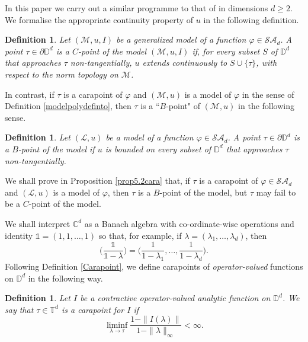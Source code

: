 \documentclass[11pt, reqno]{amsart}
\newtheorem{definition}[theorem]{Definition}
\newcommand\1{\boldsymbol {1}}
\renewcommand{\L}{\mathcal{L}}
\newcommand{\M}{\mathcal{M}}
\newcommand{\T}{\mathbb{T}}
\newcommand{\D}{\mathbb{D}}
\newcommand{\ph}{\varphi}
\newcommand\la{\lambda}
\numberwithin{equation}{section}
\begin{document}
 In this paper we carry out a similar programme to that of \cite{ATY2} in dimensions $d \geq 2$.
 We formalise the appropriate continuity property of $u$ in the following definition.
\begin{definition}{}
Let $(\mathcal{M},u,I)$ be a generalized model of a function $\varphi\in\mathcal{SA}_{d}$. A point $\tau\in \partial\mathbb{D}^{d}$ is a {\em{$C$-point of the model}} $(\mathcal{M},u,I)$ if, for every subset $S$ of $\mathbb{D}^{d}$ that approaches $\tau$ non-tangentially, $u$ extends continuously to $S\cup\{\tau\}$, with respect to the norm topology on $\mathcal{M}$. 
\end{definition}
In contrast, if $\tau$ is a carapoint of $\ph$ and $(\M,u)$ is a model of $\ph$ in the sense of Definition \ref{modelpolydefinto}, then $\tau$ is a ``$B$-point" of $(\M,u)$ in the following sense.
\begin{definition}{} Let $(\mathcal{L},u)$ be a  model of a function $\varphi\in\mathcal{SA}_{d}$. A point $\tau\in \partial\mathbb{D}^{d}$ is a {\em{$B$-point of the model}} if $u$ is bounded on every subset of $\mathbb{D}^{d}$ that approaches $\tau$ non-tangentially. 
\end{definition}
We shall prove in Proposition \ref{prop5.2cara} that, if $\tau$ is a carapoint of $\ph\in\mathcal{SA}_{d}$ and $(\L,u)$ is a model of $\ph$, then $\tau $ is a $B$-point of the model, but $\tau$ may fail to be a $C$-point of the model.

We shall interpret $\mathbb{C}^{d}$ as a Banach algebra with co-ordinate-wise operations and identity $\mathds{1}=(1,1,\hdots,1)$ so that, for example, if $\lambda=(\lambda_{1},\hdots,\lambda_{d})$, then
$$\bigg(\dfrac{\mathds{1}}{\mathds{1}-\lambda}\bigg) = \bigg(\dfrac{1}{1-\lambda_{1}},\hdots, \dfrac{1}{1-\lambda_{d}}\bigg).$$
Following Definition \ref{Carapoint}, we define carapoints of {\em operator-valued} functions on $\D^d$ in the following way.
\begin{definition} 
Let $I$ be a contractive operator-valued analytic function on $\D^d$. We say that $\tau\in\T^d$ is a {\em carapoint} for $I$ if
\[
\liminf_{\la\to\tau}\frac{1-\|I(\la)\|}{1-\|\la\|_\infty} < \infty.
\]
\end{definition}
\end{document}
